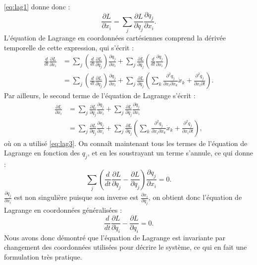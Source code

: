 \ref{eq:lag1} donne donc :
\begin{equation}
\label{eq:lag2}
\frac{\partial L}{\partial \dot{x}_i} = \sum_j\frac{\partial L}{\partial \dot{q}_j}\frac{\partial q_j}{\partial x_i}.
\end{equation}
L'équation de Lagrange en coordonnées cartésiennes comprend la dérivée temporelle de cette expression, qui s'écrit :
\begin{align*}
\frac{d}{dt}\frac{\partial L}{\partial \dot{x}_i} &= 
\sum_j\left(\frac{d}{dt}\frac{\partial L}{\partial \dot{q}_j}\right)\frac{\partial q_j}{\partial x_i}+
\sum_j\frac{\partial L}{\partial \dot{q}_j}\left(\frac{d}{dt}\frac{\partial q_j}{\partial x_i}\right) \\
&=\sum_j \left(\frac{d}{dt}\frac{\partial L}{\partial \dot{q}_j}\right)\frac{\partial q_j}{\partial x_i}+\sum_j\frac{\partial L}{\partial \dot{q}_j}\left(\sum_k \frac{\partial^2q_j}{\partial x_i \partial x_k}\dot{x}_k + \frac{\partial^2q_j}{\partial x_i \partial t}\right).
\end{align*}
Par ailleurs, le second terme de l'équation de Lagrange s'écrit :
\begin{align*}
\frac{\partial L}{\partial x_i}&= \sum_j \frac{\partial L}{\partial q_j} \frac{\partial q_j}{\partial x_i}+ \sum_j\frac{\partial L}{\partial \dot{q}_j}\frac{\partial \dot{q}_j}{\partial x_i} \\
&=\sum_j \frac{\partial L}{\partial q_j} \frac{\partial q_j}{\partial x_i}+ \sum_j\frac{\partial L}{\partial \dot{q}_j}\left(\sum_k \frac{\partial^2q_j}{\partial x_i \partial x_k}\dot{x}_k + \frac{\partial^2q_j}{\partial x_i \partial t}\right),
\end{align*}
où on a utilisé \ref{eq:lag3}. On connaît maintenant tous les termes de l'équation de Lagrange en fonction des ${q_j}$, et en les soustrayant un terme s'annule, ce qui donne :
\begin{equation*}
\sum_j\left(\frac{d}{dt}\frac{\partial L}{\partial \dot{q}_j}-\frac{\partial L}{\partial q_j}\right)\frac{\partial q_j}{\partial x_i}=0.
\end{equation*}
$\frac{\partial q_j}{\partial x_i}$ est non singulière puisque son inverse est $\frac{\partial x_i}{\partial q_j}$, on obtient donc l'équation de Lagrange en coordonnées généralisées : 
\begin{equation}
\label{eq:lagq}
\frac{d}{dt}\frac{\partial L}{\partial \dot{q}_i}-\frac{\partial L}{\partial q_i}=0.
\end{equation}
Nous avons donc démontré que l'équation de Lagrange est invariante par changement des coordonnées utilisées pour décrire le système, ce qui en fait une formulation très pratique. 

